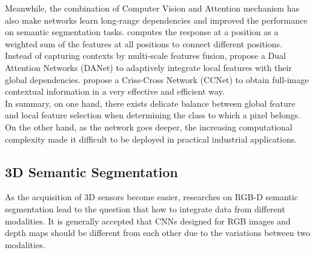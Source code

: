 \documentclass[journal]{IEEEtran}
\begin{document}
 
    Meanwhile, the combination of Computer Vision and Attention mechanism has also make networks learn long-range dependencies and improved the performance on semantic segmentation tasks. \cite{NonLocal2018} computes the response at a position as a weighted sum of the features at all positions to connect different positions. Instead of capturing contexts by multi-scale features fusion, \cite{fu2019dual} propose a Dual Attention Networks (DANet) to adaptively integrate local features with their global dependencies. \cite{huang2018ccnet} propose a Criss-Cross Network (CCNet) to obtain full-image contextual information in a very effective and efficient way. \\   
    
 
    In summary, on one hand, there exists delicate balance between global feature and local feature selection when determining the class to which a pixel belongs. On the other hand, as the network goes deeper, the increasing computational complexity made it difficult to be deployed in practical industrial applications.
    
\subsection{3D Semantic Segmentation}
 
    As the acquisition of 3D sensors become easier, researches on RGB-D semantic segmentation\cite{wang2021brief} lead to the question that how to integrate data from different modalities.  It is generally accepted that CNNs designed for RGB images and depth maps should be different from each other due to the variations between two modalities. \\   

    
 
\end{document}
